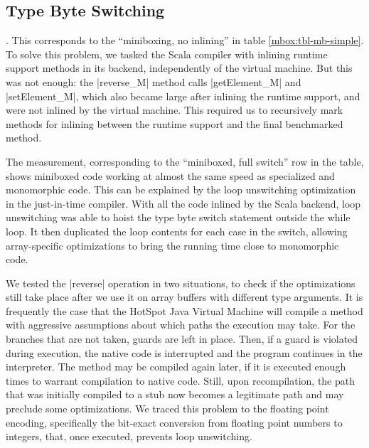 \subsection{Type Byte Switching}
\label{mbox:subsec-mb-switching}

. This corresponds to the ``miniboxing, no inlining'' in table \ref{mbox:tbl-mb-simple}. To solve this problem, we tasked the Scala compiler with inlining runtime support methods in its backend, independently of the virtual machine. But this was not enough: the |reverse_M| method calls |getElement_M| and |setElement_M|, which also became large after inlining the runtime support, and were not inlined by the virtual machine. This required us to recursively mark methods for inlining between the runtime support and the final benchmarked method.

 The measurement, corresponding to the ``miniboxed, full switch'' row in the table, shows miniboxed code working at almost the same speed as specialized and monomorphic code. This can be explained by the  loop unswitching optimization in the just-in-time compiler. With all the code inlined by the Scala backend, loop unswitching was able to hoist the type byte switch statement outside the while loop. It then duplicated the loop contents for each case in the switch, allowing array-specific optimizations to bring the running time close to monomorphic code.

 We tested the |reverse| operation in two situations, to check if the optimizations still take place after we use it on array buffers with different type arguments. It is frequently the case that the HotSpot Java Virtual Machine will compile a method with aggressive assumptions about which paths the execution may take. For the branches that are not taken, guards are left in place. Then, if a guard is violated during execution, the native code is interrupted and the program continues in the interpreter. The method may be compiled again later, if it is executed enough times to warrant compilation to native code. Still, upon recompilation, the path that was initially compiled to a stub now becomes a legitimate path and may preclude some optimizations. We traced this problem to the floating point encoding, specifically the bit-exact conversion from floating point numbers to integers, that, once executed, prevents loop unswitching.

